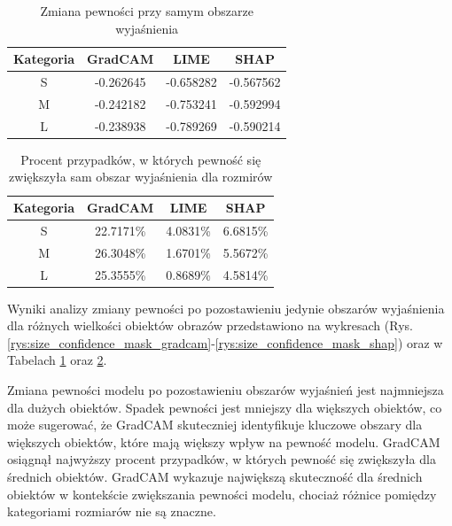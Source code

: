 \begin{table}
	\centering
	\begin{tabular}{|c|c|c|c|}
		\hline
		\textbf{Kategoria} & \textbf{GradCAM} & \textbf{LIME} & \textbf{SHAP} \\
		\hline
		S                  & -0.262645        & -0.658282     & -0.567562     \\
		\hline
		M                  & -0.242182        & -0.753241     & -0.592994     \\
		\hline
		L                  & -0.238938        & -0.789269     & -0.590214     \\
		\hline
	\end{tabular}
	\caption{Zmiana pewności przy samym obszarze wyjaśnienia}
	\label{tab:size_confidence_exp}
\end{table}

\begin{table}
	\centering
	\begin{tabular}{|c|c|c|c|}
		\hline
		\textbf{Kategoria} & \textbf{GradCAM} & \textbf{LIME} & \textbf{SHAP} \\
		\hline
		S                  & 22.7171\%        & 4.0831\%      & 6.6815\%      \\
		\hline
		M                  & 26.3048\%        & 1.6701\%      & 5.5672\%      \\
		\hline
		L                  & 25.3555\%        & 0.8689\%      & 4.5814\%      \\

		\hline
	\end{tabular}
	\caption{Procent przypadków, w których pewność się zwiększyła sam obszar wyjaśnienia dla rozmirów}
	\label{tab:size_confidence_exp_percent}
\end{table}

Wyniki analizy zmiany pewności po pozostawieniu jedynie obszarów wyjaśnienia dla różnych wielkości obiektów obrazów przedstawiono na wykresach (Rys. \ref{rys:size_confidence_mask_gradcam}-\ref{rys:size_confidence_mask_shap}) oraz w Tabelach \ref{tab:size_confidence_exp} oraz \ref{tab:size_confidence_exp_percent}.

Zmiana pewności modelu po pozostawieniu obszarów wyjaśnień jest najmniejsza dla dużych obiektów.
Spadek pewności jest mniejszy dla większych obiektów, co może sugerować, że GradCAM skuteczniej identyfikuje kluczowe obszary dla większych obiektów, które mają większy wpływ na pewność modelu.
GradCAM osiągnął najwyższy procent przypadków, w których pewność się zwiększyła dla średnich obiektów.
GradCAM wykazuje największą skuteczność dla średnich obiektów w kontekście zwiększania pewności modelu, chociaż różnice pomiędzy kategoriami rozmiarów nie są znaczne.

